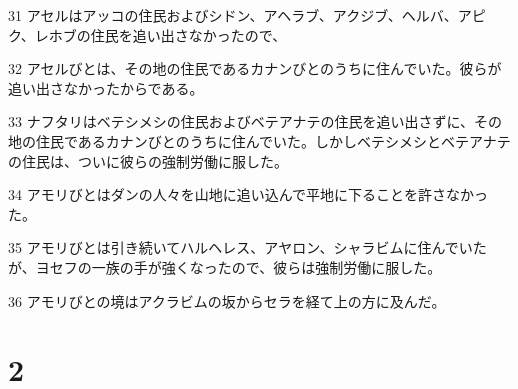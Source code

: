 \par 31 アセルはアッコの住民およびシドン、アヘラブ、アクジブ、ヘルバ、アピク、レホブの住民を追い出さなかったので、
\par 32 アセルびとは、その地の住民であるカナンびとのうちに住んでいた。彼らが追い出さなかったからである。
\par 33 ナフタリはベテシメシの住民およびベテアナテの住民を追い出さずに、その地の住民であるカナンびとのうちに住んでいた。しかしベテシメシとベテアナテの住民は、ついに彼らの強制労働に服した。
\par 34 アモリびとはダンの人々を山地に追い込んで平地に下ることを許さなかった。
\par 35 アモリびとは引き続いてハルヘレス、アヤロン、シャラビムに住んでいたが、ヨセフの一族の手が強くなったので、彼らは強制労働に服した。
\par 36 アモリびとの境はアクラビムの坂からセラを経て上の方に及んだ。

\chapter{2}

